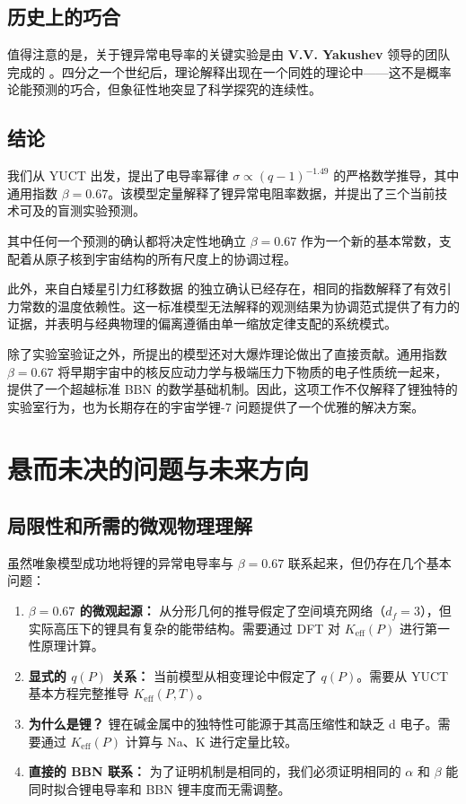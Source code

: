 \documentclass[12pt,a4paper]{article}
\theoremstyle{remark}
\newcommand{\Ke}{K_{\mathrm{eff}}}
\newcommand{\df}{d_{\!f}}
\newcommand{\alp}{\alpha}
\begin{document}
	\subsection{历史上的巧合}
	
	值得注意的是，关于锂异常电导率的关键实验是由 \textbf{V.V. Yakushev} 领导的团队完成的 \cite{fortov2001, yakushev2002, fortov1999}。四分之一个世纪后，理论解释出现在一个同姓的理论中——这不是概率论能预测的巧合，但象征性地突显了科学探究的连续性。
	
	\subsection{结论}
	
	我们从 YUCT 出发，提出了电导率幂律 \(\sigma \propto (q-1)^{-1.49}\) 的严格数学推导，其中通用指数 \(\beta = 0.67\)。该模型定量解释了锂异常电阻率数据，并提出了三个当前技术可及的盲测实验预测。
	
	其中任何一个预测的确认都将决定性地确立 \(\beta = 0.67\) 作为一个新的基本常数，支配着从原子核到宇宙结构的所有尺度上的协调过程。
	
	此外，来自白矮星引力红移数据 \cite{Crumpler2024} 的独立确认已经存在，相同的指数解释了有效引力常数的温度依赖性。这一标准模型无法解释的观测结果为协调范式提供了有力的证据，并表明与经典物理的偏离遵循由单一缩放定律支配的系统模式。
	
	除了实验室验证之外，所提出的模型还对大爆炸理论做出了直接贡献。通用指数 \(\beta = 0.67\) 将早期宇宙中的核反应动力学与极端压力下物质的电子性质统一起来，提供了一个超越标准 BBN 的数学基础机制。因此，这项工作不仅解释了锂独特的实验室行为，也为长期存在的宇宙学锂-7 问题提供了一个优雅的解决方案。
	
	\section{悬而未决的问题与未来方向}
	\label{sec:open-questions}
	
	\subsection{局限性和所需的微观物理理解}
	
	虽然唯象模型成功地将锂的异常电导率与 \(\beta = 0.67\) 联系起来，但仍存在几个基本问题：
	
	\begin{enumerate}
		\item \textbf{\(\beta = 0.67\) 的微观起源：} 从分形几何的推导假定了空间填充网络（\(\df = 3\)），但实际高压下的锂具有复杂的能带结构。需要通过 DFT 对 \(\Ke(P)\) 进行第一性原理计算。
		
		\item \textbf{显式的 \(q(P)\) 关系：} 当前模型从相变理论中假定了 \(q(P)\)。需要从 YUCT 基本方程完整推导 \(\Ke(P,T)\)。
		
		\item \textbf{为什么是锂？} 锂在碱金属中的独特性可能源于其高压缩性和缺乏 d 电子。需要通过 \(\Ke(P)\) 计算与 Na、K 进行定量比较。
		
		\item \textbf{直接的 BBN 联系：} 为了证明机制是相同的，我们必须证明相同的 \(\alp\) 和 \(\beta\) 能同时拟合锂电导率和 BBN 锂丰度而无需调整。
	\end{enumerate}
	
\end{document}
